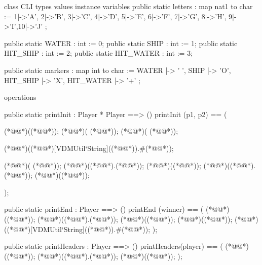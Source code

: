 \begin{vdm_al}
class CLI
 types
 values
 instance variables
  public static letters : map nat1 to char := {
   1|->'A', 2|->'B', 3|->'C', 4|->'D', 5|->'E',
   6|->'F', 7|->'G', 8|->'H', 9|->'I',10|->'J' 
  };
 
  public static WATER  : int := 0;
  public static SHIP   : int := 1;
  public static HIT_SHIP  : int := 2;
  public static HIT_WATER : int := 3;
 
 public static markers : map int to char := {
  WATER  |-> ' ',
  SHIP  |-> 'O',
  HIT_SHIP |-> 'X',
  HIT_WATER |-> '+'
 };
 
 operations
 
  public static printInit : Player * Player ==> ()
   printInit (p1, p2) == (
   
    (*@@*)((*@@*));
    (*@@*)(  (*@@*));
    (*@@*)(  (*@@*));
    
    (*@@*)((*@@*)[VDMUtil`String]((*@@*)).#(*@@*));
 
    (*@@*)(  (*@@*));
    (*@@*)((*@@*).(*@@*));
    (*@@*)((*@@*));
    (*@@*)((*@@*).(*@@*));
    (*@@*)((*@@*));
    
   );

  public static printEnd : Player ==> ()
   printEnd (winner) == (
    (*@@*)((*@@*));
    (*@@*)((*@@*).(*@@*));
    (*@@*)((*@@*));
    (*@@*)((*@@*));
    (*@@*)((*@@*)[VDMUtil`String]((*@@*)).#(*@@*));
   );

  public static printHeaders : Player ==> ()
   printHeaders(player) == (
    (*@@*)((*@@*));
    (*@@*)((*@@*).(*@@*));
    (*@@*)((*@@*));
   );


\end{vdm_al}
